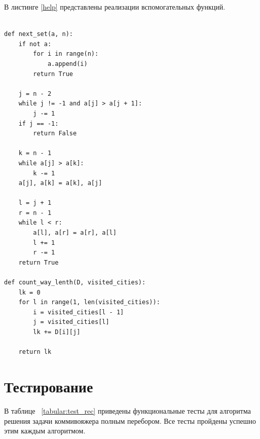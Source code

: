 \clearpage
В листинге \ref{help} представлены реализации вспомогательных функций.


\begin{lstlisting}[caption=Вспомогательные функции,
	label={help}]

def next_set(a, n):
	if not a:
		for i in range(n):
			a.append(i)
		return True
	
	j = n - 2
	while j != -1 and a[j] > a[j + 1]:
		j -= 1
	if j == -1:
		return False  
	
	k = n - 1
	while a[j] > a[k]:
		k -= 1
	a[j], a[k] = a[k], a[j]
	
	l = j + 1
	r = n - 1
	while l < r:
		a[l], a[r] = a[r], a[l]
		l += 1
		r -= 1
	return True

def count_way_lenth(D, visited_cities):
	lk = 0
	for l in range(1, len(visited_cities)):
		i = visited_cities[l - 1]
		j = visited_cities[l]
		lk += D[i][j]
	
	return lk
\end{lstlisting}


\clearpage
\section{Тестирование}

В таблице ~\ref{tabular:test_rec} приведены функциональные тесты для алгоритма решения задачи коммивояжера полным перебором. Все тесты пройдены успешно этим каждым алгоритмом.

